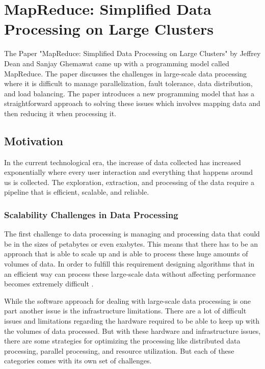\documentclass[10pt]{proc}
\begin{document}
\section{MapReduce: Simplified Data Processing on Large Clusters}

The Paper "MapReduce: Simplified Data Processing on Large Clusters" by Jeffrey Dean and Sanjay Ghemawat \cite{dean2008mapreduce} came up with a programming model called MapReduce. The paper discusses the challenges in large-scale data processing where it is difficult to manage parallelization, fault tolerance, data distribution, and load balancing. The paper introduces a new programming model that has a straightforward approach to solving these issues which involves mapping data and then reducing it when processing it.

\subsection{Motivation} \label{Motivation1}
In the current technological era, the increase of data collected has increased exponentially where every user interaction and everything that happens around us is collected. The exploration, extraction, and processing of the data require a pipeline that is efficient, scalable, and reliable.

\subsubsection{Scalability Challenges in Data Processing}  \label{ScalabilityChallenge}
The first challenge to data processing is managing and processing data that could be in the sizes of petabytes or even exabytes. This means that there has to be an approach that is able to scale up and is able to process these huge amounts of volumes of data. In order to fulfill this requirement designing algorithms that in an efficient way can process these large-scale data without affecting performance becomes extremely difficult \cite{dhaduk2022challenges}.

While the software approach for dealing with large-scale data processing is one part another issue is the infrastructure limitations. There are a lot of difficult issues and limitations regarding the hardware required to be able to keep up with the volumes of data processed. But with these hardware and infrastructure issues, there are some strategies for optimizing the processing like distributed data processing, parallel processing, and resource utilization. But each of these categories comes with its own set of challenges.
\end{document}
